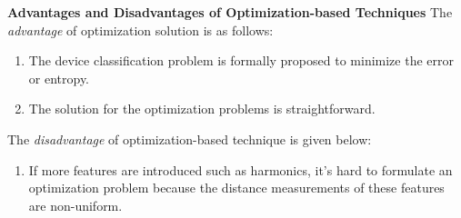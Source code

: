 \textbf{Advantages and Disadvantages of Optimization-based Techniques}
The \textit{advantage} of optimization solution is as follows:
\begin{enumerate}
\item The device classification problem is formally proposed 
to minimize the error or entropy.%
\item The solution for the optimization problems is straightforward. 
\end{enumerate}
The \textit{disadvantage} of optimization-based technique is given below:
\begin{enumerate}
\item If more features are introduced such as harmonics, 
it's hard to formulate an optimization problem because the 
distance measurements of these features 
are non-uniform. 

\end{enumerate}


